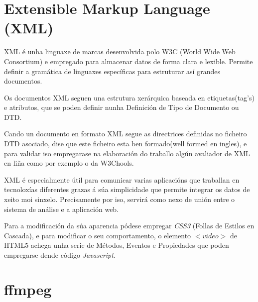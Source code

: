 \section{Extensible Markup Language (XML)}
    XML é unha linguaxe de marcas desenvolvida polo W3C (World Wide Web Consortium) e empregado
    para almacenar datos de forma clara e lexible. Permite definir a gramática de linguaxes 
    específicas para estruturar así grandes documentos.
    
    Os documentos XML seguen una estrutura xerárquica baseada en etiquetas(tag's) e atributos,
    que se poden definir nunha Definición de Tipo de Documento ou DTD. \cite{dtd-web-page}
    
    Cando un documento en formato XML segue as directrices definidas no ficheiro DTD asociado,
    dise que este ficheiro esta ben formado(well formed en ingles), e para validar iso empregarase
    na elaboración do traballo algún avaliador de XML en liña como por exemplo o da W3Chools.\cite{xml-validator}
    
    XML é especialmente útil para comunicar varias aplicacións que traballan en tecnoloxías 
    diferentes grazas á súa simplicidade que permite integrar os datos de xeito moi sinxelo. Precisamente
    por iso, servirá como nexo de unión entre o sistema de análise e a aplicación web. 
        
        
    Para a modificación da súa aparencia pódese empregar \emph{CSS3} (Follas de Estilos en 
    Cascada), e para modificar o seu comportamento, o elemento $<video>$ de HTML5 achega
    unha serie de Métodos, Eventos e Propiedades\cite{w3school-video-events} que poden
    empregarse dende código \emph{Javascript}.
    
\section{ffmpeg}
    

